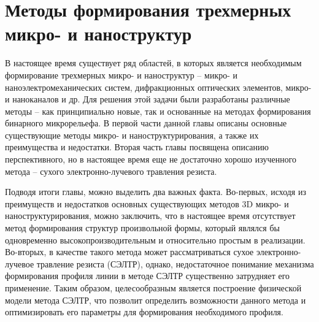 \chapter{Методы формирования трехмерных микро- и наноструктур}

В настоящее время существует ряд областей, в которых является необходимым формирование трехмерных микро- и наноструктур -- микро- и наноэлектромеханических систем, дифракционных оптических элементов, микро- и наноканалов и др.
Для решения этой задачи были разработаны различные методы -- как принципиально новые, так и основанные на методах формирования бинарного микрорельефа.
В первой части данной главы описаны основные существующие методы микро- и наноструктурирования, а также их преимущества и недостатки.
Вторая часть главы посвящена описанию перспективного, но в настоящее время еще не достаточно хорошо изученного метода -- сухого электронно-лучевого травления резиста.





Подводя итоги главы, можно выделить два важных факта.
Во-первых, исходя из преимуществ и недостатков основных существующих методов 3D микро- и наноструктурирования, можно заключить, что в настоящее время отсутствует метод формирования структур произвольной формы, который являлся бы одновременно высокопроизводительным и относительно простым в реализации.
Во-вторых, в качестве такого метода может рассматриваться сухое электронно-лучевое травление резиста (СЭЛТР), однако, недостаточное понимание механизма формирования профиля линии в методе СЭЛТР существенно затрудняет его применение.
Таким образом, целесообразным является построение физической модели метода СЭЛТР, что позволит определить возможности данного метода и оптимизировать его параметры для формирования необходимого профиля.
